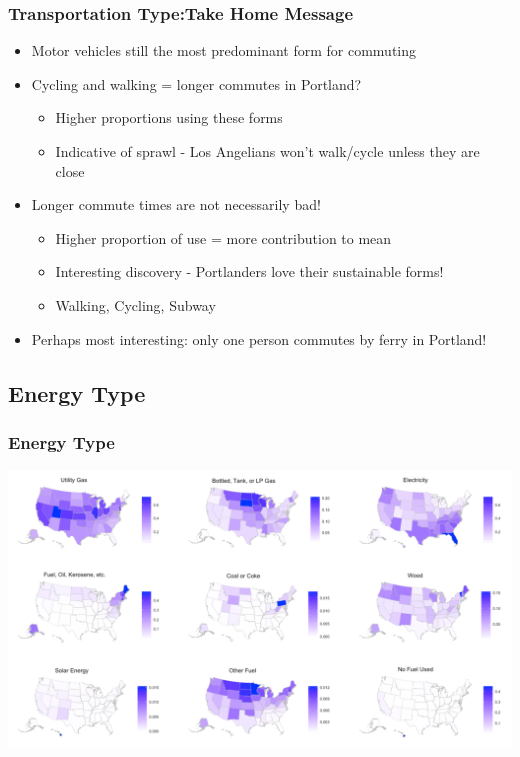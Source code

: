 \documentclass{beamer}
\begin{document}
\begin{frame}
\frametitle{Transportation Type:Take Home Message}
\begin{itemize}
\item Motor vehicles still the most predominant form for commuting
\item Cycling and walking = longer commutes in Portland?
\begin{itemize}
\item Higher proportions using these forms
\item Indicative of sprawl - Los Angelians won't walk/cycle unless they are close
\end{itemize}
\item Longer commute times are not necessarily bad!
\begin{itemize}
\item Higher proportion of use = more contribution to mean
\item Interesting discovery - Portlanders love their sustainable forms!
\item Walking, Cycling, Subway
\end{itemize}
\item Perhaps most interesting: only one person commutes by ferry in Portland!
\end{itemize}

\end{frame}


\subsection{Energy Type}
\begin{frame}
\frametitle{Energy Type}
\begin{center} 
\includegraphics[width=1 \textwidth]{AllStatesEnergyTypes}

\end{center}
\end{frame}
\end{document}
